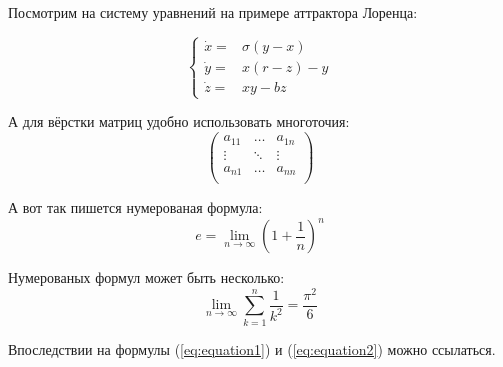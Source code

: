 Посмотрим на систему уравнений на примере аттрактора Лоренца:

$$
\left\{
  \begin{array}{rl}
    \dot x = & \sigma (y-x) \\
    \dot y = & x (r - z) - y \\
    \dot z = & xy - bz
  \end{array}
\right.
$$

А для вёрстки матриц удобно использовать многоточия:
$$
\left(
  \begin{array}{ccc}
  	a_{11} & \ldots & a_{1n} \\
  	\vdots & \ddots & \vdots \\
  	a_{n1} & \ldots & a_{nn} \\
  \end{array}
\right)
$$

А вот так пишется нумерованая формула:
\begin{equation}
  \label{eq:equation1}
  e = \lim_{n \to \infty} \left( 1+\frac{1}{n} \right) ^n
\end{equation}

Нумерованых формул может быть несколько:
\begin{equation}
  \label{eq:equation2}
  \lim_{n \to \infty} \sum_{k=1}^n \frac{1}{k^2} = \frac{\pi^2}{6}
\end{equation}

Впоследствии на формулы (\ref{eq:equation1}) и (\ref{eq:equation2}) можно ссылаться.


\clearpage